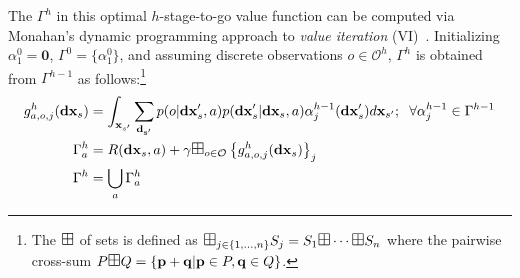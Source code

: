 \documentclass{article} %
\renewcommand{\vec}[1]{\mathbf{#1}} %
\newcommand{\xds}{\mathbf{dx}_s}
\begin{document}
The $\Gamma^h$ in
this optimal $h$-stage-to-go value function can be computed via
Monahan's dynamic programming approach to \emph{value iteration}
(VI)~\cite{monahan82}.  Initializing $\alpha^0_1 = \vec{0}$, 
$\Gamma^0 = \{ \alpha^0_1 \}$, and assuming discrete 
observations $o \in \mathcal{O}^h$,
$\Gamma^h$ is obtained from
$\Gamma^{h-1}$ as follows:\footnote{The
  $\textrm{\large $\boxplus$}$ of sets is defined as $\textrm{\large
    $\boxplus$}_{j \in \{ 1,\ldots, n \} } S_j = S_1 \textrm{\large
    $\boxplus$} \cdots \textrm{\large $\boxplus$} S_n$ where the
  pairwise cross-sum $P \textrm{\large $\boxplus$} Q = \{ \vec{p} +
  \vec{q} | \vec{p} \in P, \vec{q} \in Q \}$.}  
{\footnotesize
\vspace{-1mm}
\begin{align} 
g^h_{a,o,j}(\xds) &=  \int_{\vec{x}_{s'}} \sum_{\vec{d_{s'}}} p(o|\xds',a)p(\xds'|\xds,a) \alpha^{h-1}_j(\xds') d\vec{x}_{s'}; \hspace{2mm}  \forall \alpha^{h-1}_{j} \in \Gamma^{h-1} \label{eq:backup} \\
\Gamma^{h}_a   &= R(\xds,a) + \gamma \textrm{\large $\boxplus$}_{o \in \mathcal{O}} \left\{ g^h_{a,o,j}(\xds) \right\}_j  \label{eq:cross_prod}\\ 
\Gamma^h  &= \bigcup_a \Gamma^h_a 
\end{align}
\vspace{-4mm}
}
\end{document}
